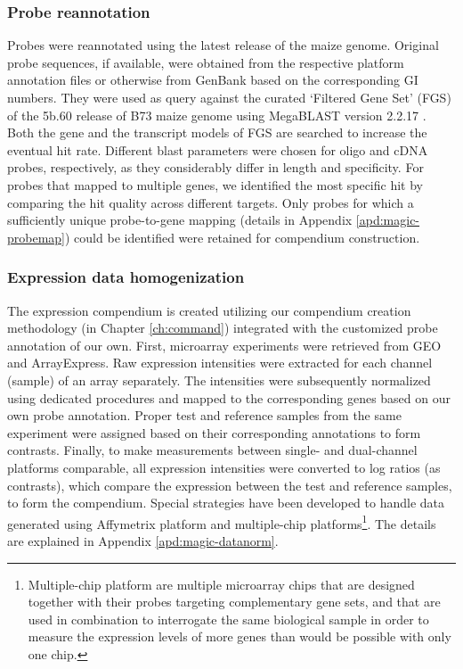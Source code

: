 \subsubsection{Probe reannotation} Probes were reannotated using the latest release of the maize genome. Original probe sequences, if available, were obtained from the respective platform annotation files or otherwise from GenBank based on the corresponding GI numbers. They were used as query against the curated ‘Filtered Gene Set’ (FGS) of the 5b.60 release of B73 maize genome using MegaBLAST version 2.2.17 \cite{Zhang2000}. Both the gene and the transcript models of FGS are searched to increase the eventual hit rate. Different blast parameters were chosen for oligo and cDNA probes, respectively, as they considerably differ in length and specificity. For probes that mapped to multiple genes, we identified the most specific hit by comparing the hit quality across different targets. Only probes for which a sufficiently unique probe-to-gene mapping (details  in Appendix \ref{apd:magic-probemap}) could be identified were retained for compendium construction.

\subsubsection{Expression data homogenization}

The expression compendium is created utilizing our compendium creation methodology (in Chapter \ref{ch:command}) integrated with the customized probe annotation of our own. First, microarray experiments were retrieved from GEO and ArrayExpress.   Raw expression intensities were extracted for each channel (sample) of an array separately.   The intensities were subsequently normalized using dedicated procedures and mapped to the corresponding genes based on our own probe annotation. Proper test and reference samples from the same experiment were assigned based on their corresponding annotations to form contrasts. Finally, to make measurements between single- and dual-channel platforms comparable, all expression intensities were converted to log ratios (as contrasts), which compare the expression between the test and reference samples, to form the compendium. Special strategies have been developed to handle data generated using Affymetrix platform and multiple-chip platforms\footnote{Multiple-chip   platform are multiple microarray chips that are designed together   with their probes targeting complementary gene sets, and that are   used in combination to interrogate the same biological sample in   order to measure the expression levels of more genes than would be   possible with only one chip.}.  The details are explained in Appendix  \ref{apd:magic-datanorm}.  



